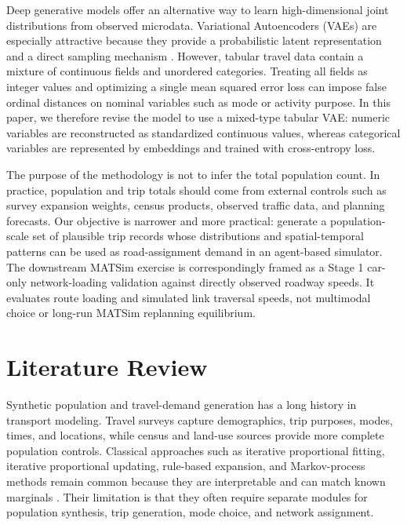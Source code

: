 \documentclass[3p,times,procedia]{elsarticle}
\begin{document}
Deep generative models offer an alternative way to learn high-dimensional joint distributions from observed microdata. Variational Autoencoders (VAEs) are especially attractive because they provide a probabilistic latent representation and a direct sampling mechanism \cite{kingma_auto-encoding_2022}. However, tabular travel data contain a mixture of continuous fields and unordered categories. Treating all fields as integer values and optimizing a single mean squared error loss can impose false ordinal distances on nominal variables such as mode or activity purpose. In this paper, we therefore revise the model to use a mixed-type tabular VAE: numeric variables are reconstructed as standardized continuous values, whereas categorical variables are represented by embeddings and trained with cross-entropy loss.

The purpose of the methodology is not to infer the total population count. In practice, population and trip totals should come from external controls such as survey expansion weights, census products, observed traffic data, and planning forecasts. Our objective is narrower and more practical: generate a population-scale set of plausible trip records whose distributions and spatial-temporal patterns can be used as road-assignment demand in an agent-based simulator. The downstream MATSim exercise is correspondingly framed as a Stage 1 car-only network-loading validation against directly observed roadway speeds. It evaluates route loading and simulated link traversal speeds, not multimodal choice or long-run MATSim replanning equilibrium.

\section{Literature Review}\label{sec:lit-review}
Synthetic population and travel-demand generation has a long history in transport modeling. Travel surveys capture demographics, trip purposes, modes, times, and locations, while census and land-use sources provide more complete population controls. Classical approaches such as iterative proportional fitting, iterative proportional updating, rule-based expansion, and Markov-process methods remain common because they are interpretable and can match known marginals \cite{ramadan2019critical}. Their limitation is that they often require separate modules for population synthesis, trip generation, mode choice, and network assignment.
\end{document}

